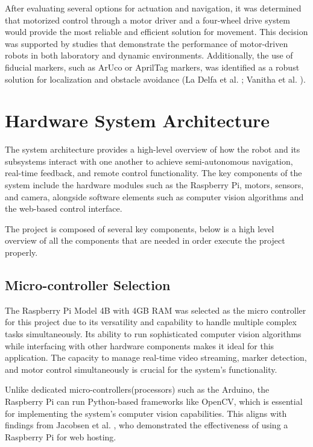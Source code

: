 After evaluating several options for actuation and navigation, it was determined that motorized control through a motor driver and a four-wheel drive system would provide the most reliable and efficient solution for movement. This decision was supported by studies that demonstrate the performance of motor-driven robots in both laboratory and dynamic environments. Additionally, the use of fiducial markers, such as ArUco or AprilTag markers, was identified as a robust solution for localization and obstacle avoidance (La Delfa et al. \cite{delfa2015}; Vanitha et al. \cite{vanitha2016}).


\section{\label{sec:hardware} Hardware System Architecture}

The system architecture provides a high-level overview of how the robot and its subsystems interact with one another to achieve semi-autonomous navigation, real-time feedback, and remote control functionality. The key components of the system include the hardware modules such as the Raspberry Pi, motors, sensors, and camera, alongside software elements such as computer vision algorithms and the web-based control interface.

The project is composed of several key components, below is a high level overview of all the components that are needed in order execute the project properly.

\subsection{Micro-controller Selection}

The Raspberry Pi Model 4B with 4GB RAM was selected as the micro controller for this project due to its versatility and capability to handle multiple complex tasks simultaneously. Its ability to run sophisticated computer vision algorithms while interfacing with other hardware components makes it ideal for this application. The capacity to manage real-time video streaming, marker detection, and motor control simultaneously is crucial for the system's functionality.

Unlike dedicated micro-controllers(processors) such as the Arduino, the Raspberry Pi can run Python-based frameworks like OpenCV, which is essential for implementing the system's computer vision capabilities. This aligns with findings from Jacobsen et al. \cite{jacobsen2018}, who demonstrated the effectiveness of using a Raspberry Pi for web hosting.

